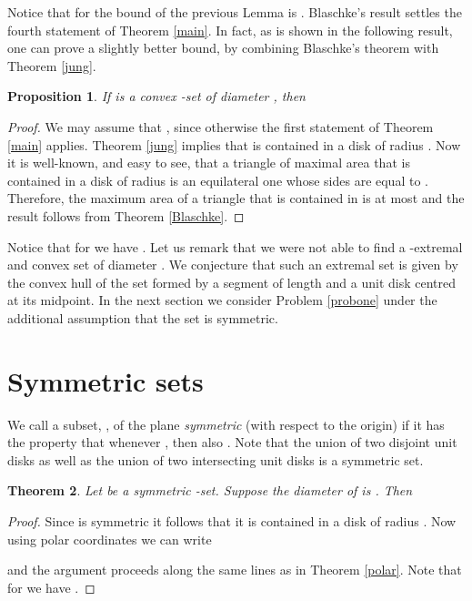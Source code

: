 \documentclass[12pt]{article}
\newtheorem{thm}{Theorem}[section]
\newtheorem{prop}[thm]{Proposition}
\begin{document}
Notice that for  the bound of the previous Lemma is . 
Blaschke's result settles the fourth statement of Theorem \ref{main}.
In fact, as is shown in the following result, one can prove a 
slightly better bound, by combining Blaschke's theorem with Theorem \ref{jung}.

\begin{prop}
If  is a \emph{convex}  -set of diameter , then 

\end{prop}
\begin{proof} We may assume that , since otherwise the first statement of Theorem \ref{main} applies. 
Theorem \ref{jung} implies that  is contained in a disk of radius 
. Now it is well-known, and easy to see, that a triangle 
of maximal area that is contained in a disk of radius  is an equilateral one whose sides are 
equal to . Therefore, the maximum area of a triangle that is contained in  is at most 
 and the result follows from Theorem \ref{Blaschke}. 
\end{proof}

Notice that for  we have .
Let us remark that we were not able to find a -extremal and convex set of 
diameter . We conjecture that such an extremal set is given 
by the convex hull of the set formed by a segment of length  and a unit disk centred 
at its midpoint.  
In the next section we consider Problem \ref{probone} under the additional assumption that 
the set  is symmetric.

\section{Symmetric sets}\label{symmetric}

We call a subset, , of the plane \emph{symmetric} (with respect to the origin) 
if it has the property that whenever , then also . Note that the union of two 
disjoint unit disks as well as the union of two intersecting unit disks is a symmetric set.


\begin{thm} Let  be a symmetric -set.
Suppose the diameter of  is . Then 

\end{thm}
\begin{proof} 
Since  is symmetric it follows that it is contained in a disk of radius . 
Now using polar coordinates we can write

and the argument proceeds along the same lines as in Theorem \ref{polar}.
Note that for  we have  
. 
\end{proof}
\end{document}
